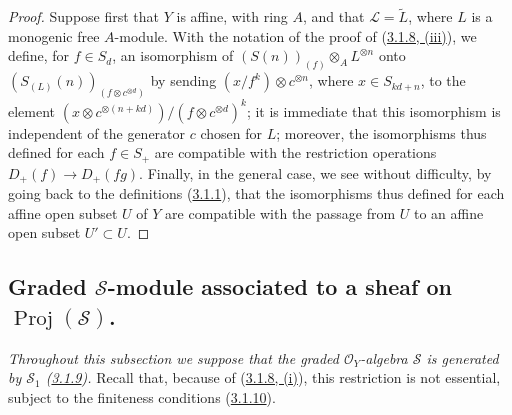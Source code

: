 \begin{proof}
Suppose first that $Y$ is affine, with ring $A$, and that
$\mathcal{L}=\widetilde{L}$, where $L$ is a monogenic free $A$-module. With
the notation of the proof of
(\hyperref[II.3.1.8]{3.1.8, (iii)}), we define, for $f\in S_d$, an
isomorphism of $(S(n))_{(f)}\otimes_A L^{\otimes n}$ onto
$(S_{(L)}(n))_{(f\otimes c^{\otimes d})}$ by sending
$(x/f^k)\otimes c^{\otimes n}$, where $x\in S_{kd+n}$, to the element
$(x\otimes c^{\otimes(n+kd)})/(f\otimes c^{\otimes d})^k$; it is immediate
that this isomorphism is independent of the generator $c$ chosen for $L$;
moreover, the isomorphisms thus defined for each $f\in S_+$ are compatible
with the restriction operations $D_+(f)\to D_+(fg)$. Finally, in the
general case, we see without difficulty, by going back to the definitions
(\hyperref[II.3.1.1]{3.1.1}), that the isomorphisms thus defined for
each affine open subset $U$ of $Y$ are compatible with the passage from $U$
to an affine open subset $U'\subset U$.
\end{proof}

\subsection{Graded $\mathcal{S}$-module associated to a sheaf on
$\operatorname{Proj}(\mathcal{S})$.}
\label{subsection:II.3.3}

\emph{Throughout this subsection we suppose that the graded
$\mathcal{O}_Y$-algebra $\mathcal{S}$ is generated by $\mathcal{S}_1$
(\hyperref[II.3.1.9]{3.1.9}).} Recall that, because of
(\hyperref[II.3.1.8]{3.1.8, (i)}), this restriction is not essential,
subject to the finiteness conditions (\hyperref[II.3.1.10]{3.1.10}).

